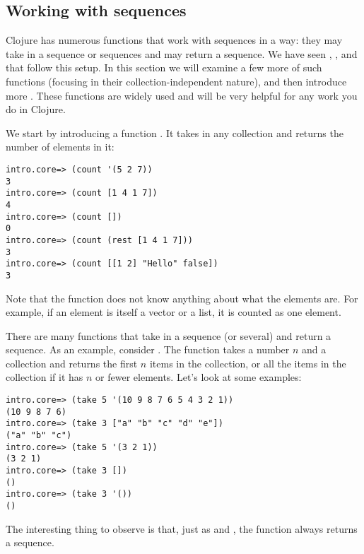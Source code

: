 \subsection{Working with sequences}\label{subsec:sequences}

Clojure has numerous functions that work with sequences in a  way: they may take in a sequence or sequences and may return a sequence. We have seen , , and  that follow this setup. In this section we will examine a few more of such functions (focusing in their collection-independent nature), and then introduce more . These functions are widely used and will be very helpful for any work you do in Clojure. 

We start by introducing a function . It takes in any collection and returns the number of elements in it:
\begin{framed}
\begin{verbatim}
intro.core=> (count '(5 2 7))
3
intro.core=> (count [1 4 1 7])
4
intro.core=> (count [])
0
intro.core=> (count (rest [1 4 1 7]))
3
intro.core=> (count [[1 2] "Hello" false])
3
\end{verbatim}
\end{framed}
Note that the function does not know anything about what the elements are. For example, if an element is itself a vector or a list, it is counted as one element. 

There are many functions that take in a sequence (or several) and return a sequence. As an example, consider . The function takes a number $n$ and a collection and returns the first $n$ items in the collection, or all the items in the collection if it has $n$ or fewer elements. Let's look at some examples:
\begin{framed}
\begin{verbatim}
intro.core=> (take 5 '(10 9 8 7 6 5 4 3 2 1))
(10 9 8 7 6)
intro.core=> (take 3 ["a" "b" "c" "d" "e"])
("a" "b" "c")
intro.core=> (take 5 '(3 2 1))
(3 2 1)
intro.core=> (take 3 [])
()
intro.core=> (take 3 '())
()
\end{verbatim}
\end{framed} 
The interesting thing to observe is that, just as  and , the function  always returns a sequence. 

